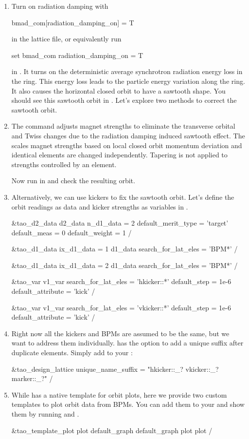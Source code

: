\documentclass{hitec}     %
\begin{document}
{{{{\begin{enumerate}[leftmargin=*]
\item Turn on radiation damping with
\begin{code}
bmad_com[radiation_damping_on] = T 
\end{code}
in the lattice file, or equivalently run
\begin{code}
set bmad_com radiation_damping_on = T
\end{code}
in \tao. It turns on the deterministic average synchrotron radiation energy loss in the ring. This energy loss leads to the particle energy variation along the ring. It also causes the horizontal closed orbit to have a sawtooth shape. You should see this sawtooth orbit in \tao. Let's explore two methods to correct the sawtooth orbit.
\item The  command adjusts magnet strengths to eliminate the transverse orbital and Twiss changes due to the radiation damping induced sawtooth effect. The  scales magnet strengths based on local closed orbit momentum deviation and identical elements are changed independently. Tapering is not applied to strengths controlled by an  element.

Now run  in \tao and check the resulting orbit.
\item Alternatively, we can use kickers to fix the sawtooth orbit. Let's define the orbit readings as data and kicker strengths as variables in . 
\begin{code}
&tao_d2_data
  	d2_data%
  	n_d1_data = 2
  	default_merit_type = 'target'
  	default_meas = 0
  	default_weight = 1
/

&tao_d1_data
	ix_d1_data = 1
	d1_data%
	search_for_lat_eles = 'BPM*'
/

&tao_d1_data
	ix_d1_data = 2
	d1_data%
	search_for_lat_eles = 'BPM*'
/

&tao_var
	v1_var%
	search_for_lat_eles = 'hkicker::*'
	default_step = 1e-6
	default_attribute = 'kick'
/

&tao_var
	v1_var%
	search_for_lat_eles = 'vkicker::*'
	default_step = 1e-6
	default_attribute = 'kick'
/
\end{code}
\item Right now all the kickers and BPMs are assumed to be the same, but we want to address them individually. \tao has the option to add a unique suffix after duplicate elements. Simply add to your :
\begin{code}
&tao_design_lattice
	unique_name_suffix = "hkicker::_? vkicker::_? marker::_?"
/
\end{code}
\item While \tao has a native template for orbit plots, here we provide two custom templates to plot orbit data from BPMs. You can add them to your  and show them by running  and .
\begin{code}
&tao_template_plot
  plot%
  default_graph%
  default_graph%
  plot%
  plot%
/


\end{code}
\end{enumerate}}}}}
\end{document}
